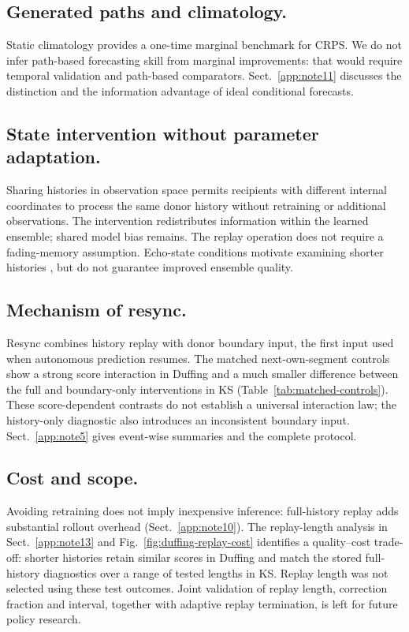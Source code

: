 \documentclass[gmd,manuscript]{copernicus}
\begin{document}
\subsection{Generated paths and climatology.}
Static climatology provides a one-time marginal benchmark for CRPS. We do not infer path-based forecasting skill from marginal improvements: that would require temporal validation and path-based comparators. Sect.~\ref{app:note11} discusses the distinction and the information advantage of ideal conditional forecasts.

\subsection{State intervention without parameter adaptation.}
Sharing histories in observation space permits recipients with different internal coordinates to process the same donor history without retraining or additional observations. The intervention redistributes information within the learned ensemble; shared model bias remains. The replay operation does not require a fading-memory assumption. Echo-state conditions motivate examining shorter histories \citep{jaeger2001echo,yildiz2012revisiting,platt2021robust}, but do not guarantee improved ensemble quality.

\subsection{Mechanism of resync.}
Resync combines history replay with donor boundary input, the first input used when autonomous prediction resumes. The matched next-own-segment controls show a strong score interaction in Duffing and a much smaller difference between the full and boundary-only interventions in KS (Table~\ref{tab:matched-controls}). These score-dependent contrasts do not establish a universal interaction law; the history-only diagnostic also introduces an inconsistent boundary input. Sect.~\ref{app:note5} gives event-wise summaries and the complete protocol.

\subsection{Cost and scope.}
Avoiding retraining does not imply inexpensive inference: full-history replay adds substantial rollout overhead (Sect.~\ref{app:note10}). The replay-length analysis in Sect.~\ref{app:note13} and Fig.~\ref{fig:duffing-replay-cost} identifies a quality--cost trade-off: shorter histories retain similar scores in Duffing and match the stored full-history diagnostics over a range of tested lengths in KS. Replay length was not selected using these test outcomes. Joint validation of replay length, correction fraction and interval, together with adaptive replay termination, is left for future policy research.
\end{document}
